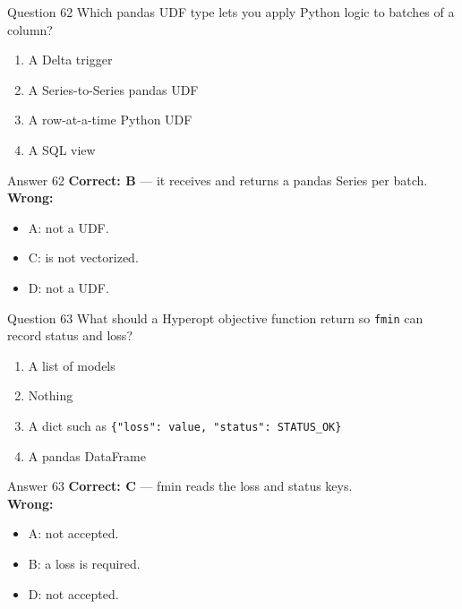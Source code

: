 \documentclass[aspectratio=169,11pt]{beamer}
\begin{document}
\begin{frame}{Question 62}
Which pandas UDF type lets you apply Python logic to batches of a column?
\begin{enumerate}[label=\Alph*.]
\item A Delta trigger
\item A Series-to-Series pandas UDF
\item A row-at-a-time Python UDF
\item A SQL view
\end{enumerate}
\end{frame}
\begin{frame}{Answer 62}
\textbf{Correct: B} --- it receives and returns a pandas Series per batch.\\
\vspace{0.5em}
\textbf{Wrong:}
\begin{itemize}
\item A: not a UDF.
\item C: is not vectorized.
\item D: not a UDF.
\end{itemize}
\end{frame}

\begin{frame}{Question 63}
What should a Hyperopt objective function return so \texttt{fmin} can record status and loss?
\begin{enumerate}[label=\Alph*.]
\item A list of models
\item Nothing
\item A dict such as \texttt{\{"loss": value, "status": STATUS\_OK\}}
\item A pandas DataFrame
\end{enumerate}
\end{frame}
\begin{frame}{Answer 63}
\textbf{Correct: C} --- fmin reads the loss and status keys.\\
\vspace{0.5em}
\textbf{Wrong:}
\begin{itemize}
\item A: not accepted.
\item B: a loss is required.
\item D: not accepted.
\end{itemize}
\end{frame}
\end{document}
